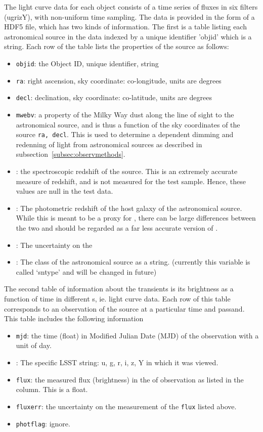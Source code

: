 \documentclass[\docopts]{\docclass}
\begin{document}
The light curve data for each object consists 
of a time series of fluxes in six filters (ugrizY), 
with non-uniform  time sampling.
The {\plasticc} data is provided in the form of a HDF5 file, which has two kinds of information. The first
is a table listing each astronomical source in the data indexed by a unique identifier 'objid' which is a string. Each row of the table lists the properties of the source as follows: 
\begin{itemize}
\item {\tt objid}: the Object ID, unique identifier, string
\item {\tt ra}: right ascension, sky coordinate: co-longitude, units are degrees
\item {\tt decl}: declination, sky coordinate: co-latitude, units are degrees
\item {\tt mwebv}: a property of the Milky Way dust along the line of sight to the astronomical source, and is thus a function of the sky coordinates of the source {\tt ra, decl}. This is used  to determine a {\passband} dependent dimming and redenning of light from astronomical sources as described in subsection~\ref{subsec:observmethods}.
\item {\specz}: the spectroscopic redshift of the source. This is an extremely accurate measure of redshift, 
    and is not measured for the test sample. Hence, these values are null in the test data.
\item {\hostphotoz} : The photometric redshift of the host galaxy of the astronomical source. While this is meant to be a proxy for {\specz}, there can be large differences between the two and should be regarded as a far less accurate version of {\specz}. 
\item {\hostphotozerr} : The uncertainty on the {\hostphotoz}
\item {\class} : The class of the astronomical source as a string. (currently this variable is called `sntype' and will be changed in future)
\end{itemize}

The second table of information about the transients is its brightness as a function of time in different {\passband}s, ie. light curve data. Each row of this table corresponds to an observation of the source at a particular time and passand.  This table includes the following information
\begin{itemize}
\item {\tt mjd}: the time (float) in Modified Julian Date (MJD) of the observation with a unit of day.
\item {\passband} : The specific LSST {\passband} string: u, g, r, i, z, Y in which it was viewed. 
\item {\tt flux}: the measured flux (brightness) in the {\passband} of observation as listed in the {\passband} column. This is a float.
\item {\tt fluxerr}: the uncertainty on the measurement of the {\tt flux}  listed above.
\item {\tt photflag}: ignore.
\end{itemize}
\end{document}
